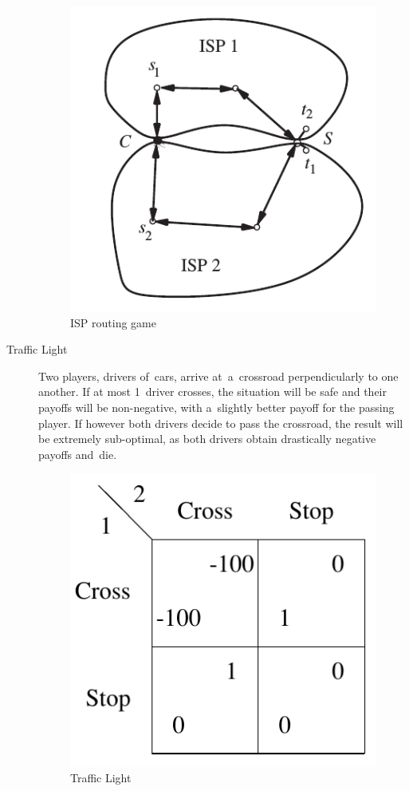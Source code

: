 \begin{description}
    \begin{figure}[H]
      \centering
      \includegraphics[width=.25\paperwidth]{../img/isp.png}
      \caption{ISP routing game}
      \label{fig:isp-routing}
    \end{figure}

  \item [Traffic Light]
    Two players, drivers of~cars, arrive at~a~crossroad perpendicularly to one another.
    If at most 1~driver crosses, the situation will be safe and their payoffs will be non-negative, with a~slightly better payoff for the passing player.
    If however both drivers decide to pass the crossroad, the result will be extremely sub-optimal, as both drivers obtain drastically negative payoffs and~die.

    \begin{figure}[H]
      \centering
      \includegraphics[width=.23\paperwidth]{../img/traffic-light.png}
      \caption{Traffic Light}
      \label{fig:traffic-light}
    \end{figure}


\end{description}

